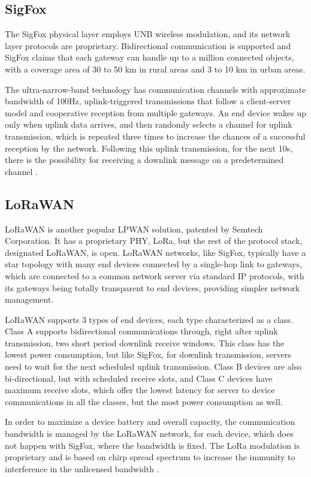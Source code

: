 \subsection{SigFox}

The SigFox physical layer employs \ac{UNB} wireless modulation, and its network layer protocols are proprietary. Bidirectional communication is supported and SigFox claims that each gateway can handle up to a million connected objects, with a coverage area of 30 to 50 km in rural areas and 3 to 10 km in urban areas.

The ultra-narrow-band technology has communication channels with approximate bandwidth of 100Hz, uplink-triggered transmissions that follow a client-server model and cooperative reception from multiple gateways. An end device wakes up only when uplink data arrives, and then randomly selects a channel for uplink transmission, which is repeated three times to increase the chances of a successful reception by the network. Following this uplink transmission, for the next 10s, there is the possibility for receiving a downlink message on a predetermined channel \cite{Yang2017}.

\subsection{LoRaWAN}

LoRaWAN is another popular LPWAN solution, patented by Semtech Corporation. It has a proprietary \ac{PHY}, \ac{LoRa}, but the rest of the protocol stack, designated LoRaWAN, is open. LoRaWAN networks, like SigFox, typically have a star topology with many end devices connected by a single-hop link to gateways, which are connected to a common network server via standard IP protocols, with its gateways
being totally transparent to end devices, providing simpler network management.

LoRaWAN supports 3 types of end devices, each type characterized as a class. Class A supports bidirectional communications through, right after uplink transmission, two short period downlink receive windows. This class has the lowest power consumption, but like SigFox, for downlink transmission, servers need to wait for the next scheduled uplink transmission. Class B devices are also bi-directional, but with scheduled receive slots, and Class C devices have maximum receive slots, which offer the lowest latency for server to device communications in all the classes, but the most power consumption as well.

In order to maximize a device battery and overall capacity, the communication bandwidth is managed by the LoRaWAN network, for each device, which does not happen with SigFox, where the bandwidth is fixed. The LoRa modulation is proprietary and is based on chirp spread spectrum to increase the immunity to interference in the unlicensed bandwidth \cite{LoRaAlliance2017}.

